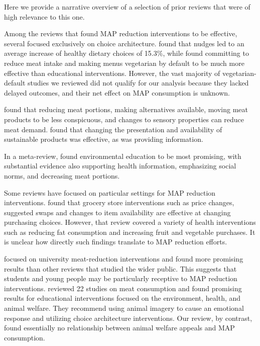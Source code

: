 \documentclass[sn-nature,pdflatex]{sn-jnl}
\begin{document}
Here we provide a narrative overview of a selection of prior reviews
that were of high relevance to this one.

Among the reviews that found MAP reduction interventions to be
effective, several focused exclusively on choice architecture.
\citep{arno2016} found that nudges led to an average increase of healthy
dietary choices of 15.3\%, while \citep{byerly2018} found committing to
reduce meat intake and making menus vegetarian by default to be much
more effective than educational interventions. However, the vast
majority of vegetarian-default studies we reviewed did not qualify for
our analysis because they lacked delayed outcomes, and their net effect
on MAP consumption is unknown.

\citep{bianchi2018restructuring} found that reducing meat portions,
making alternatives available, moving meat products to be less
conspicuous, and changes to sensory properties can reduce meat demand.
\citep{pandey2023} found that changing the presentation and availability
of sustainable products was effective, as was providing information.

In a meta-review, \citep{grundy2022} found environmental education to be
most promising, with substantial evidence also supporting health
information, emphasizing social norms, and decreasing meat portions.

Some reviews have focused on particular settings for MAP reduction
interventions. \citep{hartmannboyce2018} found that grocery store
interventions such as price changes, suggested swaps and changes to item
availability are effective at changing purchasing choices. However, that
review covered a variety of health interventions such as reducing fat
consumption and increasing fruit and vegetable purchases. It is unclear
how directly such findings translate to MAP reduction efforts.

\citep{chang2023} focused on university meat-reduction interventions and
found more promising results than other reviews that studied the wider
public. This suggests that students and young people may be particularly
receptive to MAP reduction interventions. \citep{harguess2020} reviewed
22 studies on meat consumption and found promising results for
educational interventions focused on the environment, health, and animal
welfare. They recommend using animal imagery to cause an emotional
response and utilizing choice architecture interventions. Our review, by
contrast, found essentially no relationship between animal welfare
appeals and MAP consumption.
\end{document}
